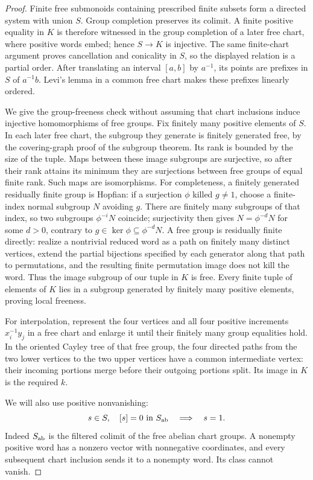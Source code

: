 \begin{proof}
Finite free submonoids containing prescribed finite subsets
form a directed system with union $S$. Group completion
preserves its colimit. A finite positive equality in $K$ is
therefore witnessed in the group completion of a later free
chart, where positive words embed; hence $S\to K$ is injective.
The same finite-chart argument proves cancellation and conicality
in $S$, so the displayed relation is a partial order.
After translating an interval $[a,b]$ by $a^{-1}$, its points
are prefixes in $S$ of $a^{-1}b$. Levi's lemma in a common
free chart makes these prefixes linearly ordered.

We give the group-freeness check without assuming that chart
inclusions induce injective homomorphisms of free groups.
Fix finitely many positive elements of $S$. In each later free
chart, the subgroup they generate is finitely generated free,
by the covering-graph proof of the subgroup theorem. Its rank
is bounded by the size of the tuple. Maps between these image
subgroups are surjective, so after their rank attains its minimum
they are surjections between free groups of equal finite rank.
Such maps are isomorphisms. For completeness, a finitely
generated residually finite group is Hopfian: if a surjection
$\phi$ killed $g\ne1$, choose a finite-index normal subgroup
$N$ avoiding $g$. There are finitely many subgroups of that
index, so two subgroups $\phi^{-i}N$ coincide; surjectivity then
gives $N=\phi^{-d}N$ for some $d>0$, contrary to
$g\in\ker\phi\subseteq\phi^{-d}N$. A free group is residually
finite directly: realize a nontrivial reduced word as a path
on finitely many distinct vertices, extend the partial bijections
specified by each generator along that path to permutations,
and the resulting finite permutation image does not kill the
word. Thus the image subgroup of our tuple in $K$ is free.
Every finite tuple of elements of $K$ lies in a subgroup generated
by finitely many positive elements, proving local freeness.

For interpolation, represent the four vertices and all four
positive increments $x_i^{-1}y_j$ in a free chart and enlarge
it until their finitely many group equalities hold. In the
oriented Cayley tree of that free group, the four directed paths
from the two lower vertices to the two upper vertices have a
common intermediate vertex: their incoming portions merge
before their outgoing portions split. Its image in $K$ is the
required $k$.

We will also use positive nonvanishing:
\[
 s\in S,\quad [s]=0\text{ in }S_{\mathrm{ab}}
 \quad\Longrightarrow\quad s=1.
\]
Indeed $S_{\mathrm{ab}}$ is the filtered colimit of the free abelian
chart groups. A nonempty positive word has a nonzero vector
with nonnegative coordinates, and every subsequent chart
inclusion sends it to a nonempty word. Its class cannot vanish.


\end{proof}
